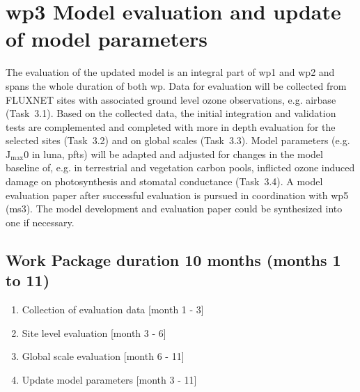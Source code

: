 \section{\gls{wp}3 Model evaluation and update of model parameters}
\label{sec:wp3}
The evaluation of the updated model is an integral part of \gls{wp}1 and \gls{wp}2 and spans the whole duration of both \gls{wp}. Data for evaluation will be collected from FLUXNET sites with associated ground level ozone observations, e.g. \gls{airbase} (Task~3.1). Based on the collected data, the initial integration and validation tests are complemented and completed with more in depth evaluation for the selected sites (Task~3.2) and on global scales (Task~3.3). Model parameters  (e.g. $\mathrm{J_{max}}$0 in \gls{luna}, \glspl{pft}) will be adapted and adjusted for changes in the model baseline of, e.g. in terrestrial and vegetation carbon pools, inflicted ozone induced damage on photosynthesis and stomatal conductance (Task~3.4). A model evaluation paper after successful evaluation is pursued in coordination with \gls{wp}5 (\gls{ms}3). The model development and evaluation paper could be synthesized into one if necessary.

\subsection*{Work Package duration 10 months (months 1 to 11)}
\begin{enumerate}[start=1,label={T3.\arabic*}]
  \itemsep0pt
\item Collection of evaluation data \hfill [month 1 - 3]
\item Site level evaluation \hfill [month 3 - 6]
\item Global scale evaluation \hfill [month 6 - 11]
\item Update model parameters \hfill [month 3 - 11]
\end{enumerate}

